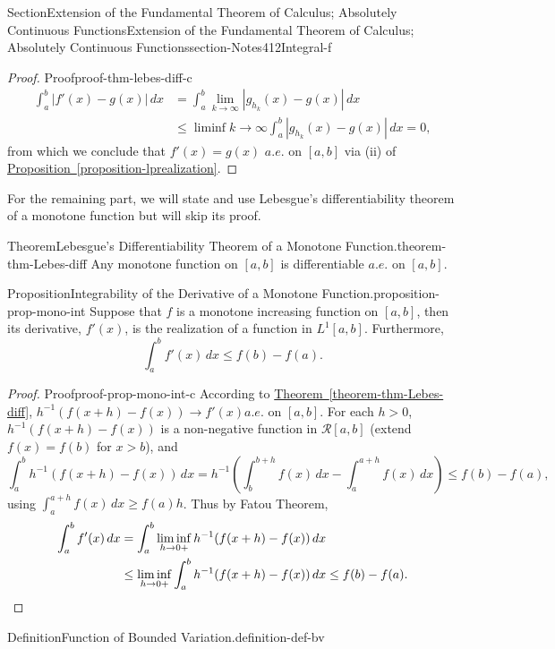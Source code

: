 \documentclass[oneside,10pt,]{article}
\newcommand{\xreffont}{\relax}
\numberwithin{equation}{section}
\newcommand{\qedhere}{\relax}
\newcommand{\cR}{\mathcal{R}}
\newcommand{\amp}{&}
\begin{document}
\begin{sectionptx}{Section}{Extension of the Fundamental Theorem of Calculus; Absolutely Continuous Functions}{}{Extension of the Fundamental Theorem of Calculus; Absolutely Continuous Functions}{}{}{section-Notes412Integral-f}
\begin{proof}{Proof}{}{proof-thm-lebes-diff-c}
\begin{align*}
\int_{a}^{b} |f'(x)-g(x)|\, dx \amp= \int_{a}^{b} \lim_{k\to \infty }|g_{h_{k}}(x)-g(x)|\, dx \\
\amp \le \liminf{k\to \infty}  \int_{a}^{b} |g_{h_{k}}(x)-g(x)|\, dx=0,
\end{align*}
from which we conclude that \(f'(x)=g(x)\) \(a.e.\) on \([a, b]\) via (ii) of \hyperref[proposition-lprealization]{Proposition~{\xreffont\ref{proposition-lprealization}}}.%
\end{proof}
For the remaining part, we will state and use Lebesgue's differentiability theorem of a monotone function but will skip its proof.%
\begin{theorem}{Theorem}{Lebesgue's Differentiability Theorem of a Monotone Function.}{}{theorem-thm-Lebes-diff}%
Any monotone function on \([a, b]\) is differentiable \(a.e.\) on \([a, b]\).%
\end{theorem}
\begin{proposition}{Proposition}{Integrability of the Derivative of a Monotone Function.}{}{proposition-prop-mono-int}%
Suppose that \(f\) is a monotone increasing function on \([a, b]\), then its derivative, \(f'(x)\), is the realization of a function in \(L^{1}[a, b]\). Furthermore,%
\begin{equation*}
\int_{a}^{b} f'(x)\,dx \le f(b)-f(a).
\end{equation*}
\end{proposition}
\begin{proof}{Proof}{}{proof-prop-mono-int-c}
According to \hyperref[theorem-thm-Lebes-diff]{Theorem~{\xreffont\ref{theorem-thm-Lebes-diff}}}, \(h^{-1}(f(x+h)-f(x))\to f'(x)\)\(a.e.\) on \([a, b]\). For each \(h > 0\), \(h^{-1}(f(x+h)-f(x)) \) is a non-negative function in \(\cR[a, b]\) (extend \(f(x)=f(b)\) for \(x > b\)), and%
\begin{equation*}
\int_{a}^{b} h^{-1}(f(x+h)-f(x)) \, dx =h^{-1}\left( \int_{b}^{b+h} f(x)\,dx - \int_{a}^{a+h} f(x)\, dx\right)
\le f(b)- f(a),
\end{equation*}
using \(\int_{a}^{a+h} f(x)\, dx\ge f(a) h\). Thus by Fatou Theorem,%
\begin{align*}
\int_{a}^{b} f'(x)\, dx \amp = \int_{a}^{b} \liminf_{h\to 0+} h^{-1}(f(x+h)-f(x)) \, dx\\
\amp  \le
\liminf_{h\to 0+} \int_{a}^{b}  h^{-1}(f(x+h)-f(x)) \, dx \le f(b)-f(a).\qedhere
\end{align*}
\end{proof}
\begin{definition}{Definition}{Function of Bounded Variation.}{definition-def-bv}%

\end{definition}
\end{sectionptx}
\end{document}
